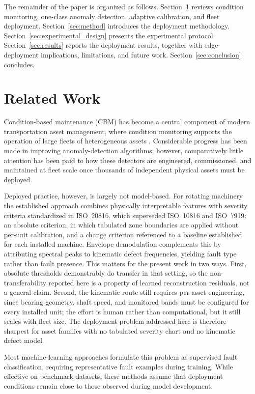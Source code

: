 \documentclass{trbunofficial}
\begin{document}
The remainder of the paper is organized as follows. Section~\ref{sec:related} reviews condition
monitoring, one-class anomaly detection, adaptive calibration, and fleet deployment.
Section~\ref{sec:method} introduces the deployment methodology.
Section~\ref{sec:experimental_design} presents the experimental protocol.
Section~\ref{sec:results} reports the deployment results, together with edge-deployment
implications, limitations, and future work.
Section~\ref{sec:conclusion} concludes.

\section{Related Work}
\label{sec:related}

Condition-based maintenance (CBM) has become a central component of modern
transportation asset management, where condition monitoring supports the
operation of large fleets of heterogeneous assets
\citep{jardine2006,chandola2009,zhao2019}. Considerable progress has been made
in improving anomaly-detection algorithms; however, comparatively little
attention has been paid to how these detectors are engineered, commissioned,
and maintained at fleet scale once thousands of independent physical assets
must be deployed.

Deployed practice, however, is largely not model-based. For rotating
machinery the established approach combines physically interpretable
features with severity criteria standardized in ISO~20816, which superseded
ISO~10816 and ISO~7919: an absolute criterion, in which tabulated zone
boundaries are applied without per-unit calibration, and a change criterion
referenced to a baseline established for each installed machine. Envelope
demodulation complements this by attributing spectral peaks to kinematic
defect frequencies, yielding fault type rather than fault presence. This
matters for the present work in two ways. First, absolute thresholds
demonstrably do transfer in that setting, so the non-transferability
reported here is a property of learned reconstruction residuals, not a
general claim. Second, the kinematic route still requires per-asset
engineering, since bearing geometry, shaft speed, and monitored bands must
be configured for every installed unit; the effort is human rather than
computational, but it still scales with fleet size. The deployment problem
addressed here is therefore sharpest for asset families with no tabulated
severity chart and no kinematic defect model.

Most machine-learning approaches formulate this problem as supervised fault
classification, requiring representative fault examples during training.
While effective on benchmark datasets, these methods assume that deployment
conditions remain close to those observed during model development.
\end{document}
